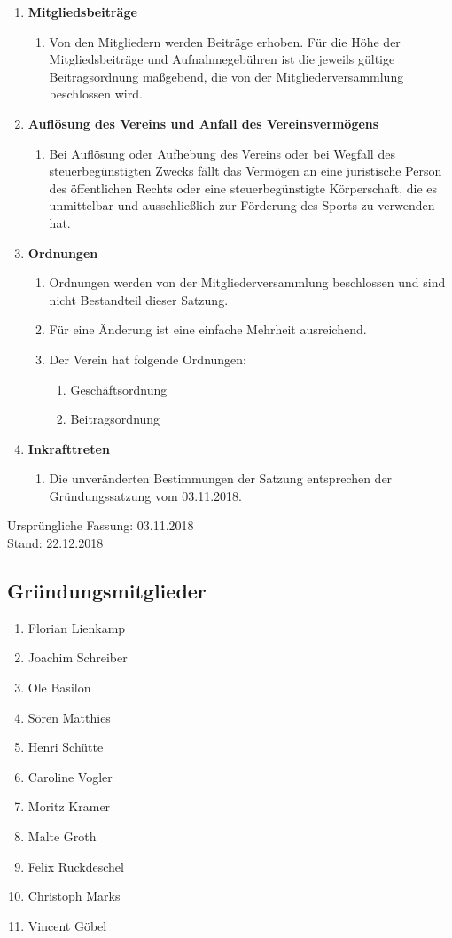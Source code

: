 \documentclass{article}
\begin{document}
\begin{enumerate}[§ 1.]
\item \textsf{\textbf{Mitgliedsbeiträge}}
\begin{enumerate}
\item[] Von den Mitgliedern werden Beiträge erhoben. Für die Höhe der Mitgliedsbeiträge und Aufnahmegebühren ist die jeweils gültige Beitragsordnung maßgebend, die von der Mitgliederversammlung beschlossen wird.
\end{enumerate}

\item \textsf{\textbf{Auflösung des Vereins und Anfall des Vereinsvermögens}}
\begin{enumerate}
\item[] Bei Auflösung oder Aufhebung des Vereins oder bei Wegfall des steuerbegünstigten Zwecks fällt das Vermögen an eine juristische Person des öffentlichen Rechts oder eine steuerbegünstigte Körperschaft, die es unmittelbar und ausschließlich zur Förderung des Sports zu verwenden hat.
\end{enumerate}

\item \textsf{\textbf{Ordnungen}}
\begin{enumerate}
\item Ordnungen werden von der Mitgliederversammlung beschlossen und sind nicht Bestandteil dieser Satzung.
\item Für eine Änderung ist eine einfache Mehrheit ausreichend.
\item Der Verein hat folgende Ordnungen:
\begin{enumerate}
\item Geschäftsordnung
\item Beitragsordnung
\end{enumerate}
\end{enumerate}

\item \textsf{\textbf{Inkrafttreten}}
\begin{enumerate}
\item[] Die unveränderten Bestimmungen der Satzung entsprechen der Gründungssatzung vom 03.11.2018.
\end{enumerate}

\end{enumerate}
Ursprüngliche Fassung: 03.11.2018\\
Stand: 22.12.2018


\subsection*{Gründungsmitglieder}
\begin{enumerate}
\item Florian Lienkamp
\item Joachim Schreiber
\item Ole Basilon
\item Sören Matthies
\item Henri Schütte
\item Caroline Vogler
\item Moritz Kramer
\item Malte Groth
\item Felix Ruckdeschel
\item Christoph Marks
\item Vincent Göbel
\end{enumerate}
\end{document}
